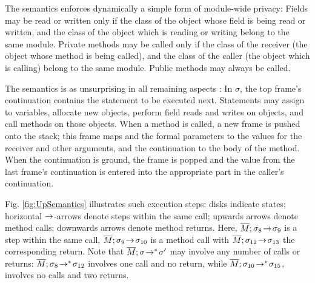 {The semantics enforces dynamically a simple form of module-wide privacy: 
Fields may be read or written only if the class of the object whose field is being read or written, and the class of the object which is reading or writing belong to the same module.}
Private methods may be called only if the class of the receiver (the object whose method is being called), and the class of the caller (the object which is calling) belong to the same module.
Public methods may always be called.

The semantics is as unsurprising in all remaining aspects  :  
In $\sigma$, the  top frame's continuation contains the statement to be  executed next.  
 Statements may assign to variables, allocate new objects, 
perform field reads and writes on objects, and
 call methods on those objects. 
When a method is called, a new frame is pushed onto the stack; this frame  maps  and the formal parameters to  the values for the receiver and other arguments, and the continuation to the body of the method.  When the continuation is ground, the frame is popped and the value from the last frame's continuation is entered into the appropriate part in the caller's continuation. 


{Fig. \ref{fig:UpSemantics} illustrates  such  execution steps:  disks indicate states;
 horizontal $\rightarrow$-arrows denote   steps  within the same  call; upwards arrows denote  method calls;
 downwards arrows denote method returns. %
 Here,   $\overline{M};\sigma_8\! \rightarrow\! {\sigma_9} $ is a step within the same call, $\overline{M};\sigma_9\! \rightarrow\! {\sigma_{10}} $ is a method call   
with $\overline{M};\sigma_{12}\! \rightarrow\! {\sigma_{13}} $ %
the corresponding return. 
 {Note that  $\overline{M};\sigma\! \rightarrow^*\! {\sigma'}$ may involve  any number of  calls or returns: 
 $\overline{M};\sigma_8\! \rightarrow^*\! {\sigma_{12}}$ involves one call and no return,
while $\overline{M};\sigma_{10}\! \rightarrow^*\! {\sigma_{15}}$,   involves no calls and two returns.
}
} 

